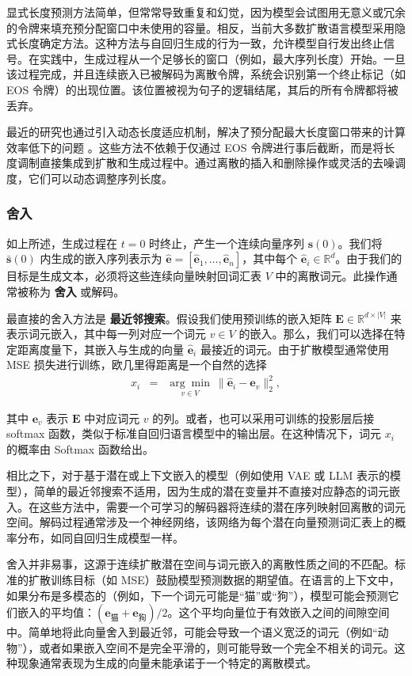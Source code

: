 显式长度预测方法简单，但常常导致重复和幻觉，因为模型会试图用无意义或冗余的令牌来填充预分配窗口中未使用的容量。相反，当前大多数扩散语言模型采用隐式长度确定方法。这种方法与自回归生成的行为一致，允许模型自行发出终止信号。在实践中，生成过程从一个足够长的窗口（例如，最大序列长度）开始。一旦该过程完成，并且连续嵌入已被解码为离散令牌，系统会识别第一个终止标记（如 EOS 令牌）的出现位置。该位置被视为句子的逻辑结尾，其后的所有令牌都将被丢弃。

最近的研究也通过引入动态长度适应机制，解决了预分配最大长度窗口带来的计算效率低下的问题 \citep{li-etal:2025fixed,yang-etal:2025diffusion}。这些方法不依赖于仅通过 EOS 令牌进行事后截断，而是将长度调制直接集成到扩散和生成过程中。通过离散的插入和删除操作或灵活的去噪调度，它们可以动态调整序列长度。
\subsubsection{舍入}

如上所述，生成过程在 $t=0$ 时终止，产生一个连续向量序列 $\mathbf{s}(0)$。我们将 $\bar{\mathbf{s}}(0)$ 内生成的嵌入序列表示为 $\hat{\mathbf{e}} = [\hat{\mathbf{e}}_1, \dots, \hat{\mathbf{e}}_n]$，其中每个 $\hat{\mathbf{e}}_i \in \mathbb{R}^d$。由于我们的目标是生成文本，必须将这些连续向量映射回词汇表 $V$ 中的离散词元。此操作通常被称为 \textbf{舍入} 或解码。

最直接的舍入方法是 \textbf{最近邻搜索}。假设我们使用预训练的嵌入矩阵 $\mathbf{E} \in \mathbb{R}^{d \times |V|}$ 来表示词元嵌入，其中每一列对应一个词元 $v \in V$ 的嵌入。那么，我们可以选择在特定距离度量下，其嵌入与生成的向量 $\hat{\mathbf{e}}_i$ 最接近的词元。由于扩散模型通常使用 MSE 损失进行训练，欧几里得距离是一个自然的选择
\begin{eqnarray}
x_i & = & \underset{v \in V}{\arg\min} \ \|\hat{\mathbf{e}}_i - \mathbf{e}_v\|_2^2,
\end{eqnarray}

\noindent 其中 $\mathbf{e}_v$ 表示 $\mathbf{E}$ 中对应词元 $v$ 的列。或者，也可以采用可训练的投影层后接 softmax 函数，类似于标准自回归语言模型中的输出层。在这种情况下，词元 $x_i$ 的概率由 Softmax 函数给出。

相比之下，对于基于潜在或上下文嵌入的模型（例如使用 VAE 或 LLM 表示的模型），简单的最近邻搜索不适用，因为生成的潜在变量并不直接对应静态的词元嵌入。在这些方法中，需要一个可学习的解码器将连续的潜在序列映射回离散的词元空间。解码过程通常涉及一个神经网络，该网络为每个潜在向量预测词汇表上的概率分布，如同自回归生成模型一样。

舍入并非易事，这源于连续扩散潜在空间与词元嵌入的离散性质之间的不匹配。标准的扩散训练目标（如 MSE）鼓励模型预测数据的期望值。在语言的上下文中，如果分布是多模态的（例如，下一个词元可能是“猫”或“狗”），模型可能会预测它们嵌入的平均值：$(\mathbf{e}_{\text{猫}} + \mathbf{e}_{\text{狗}})/2$。这个平均向量位于有效嵌入之间的间隙空间中。简单地将此向量舍入到最近邻，可能会导致一个语义宽泛的词元（例如“动物”），或者如果嵌入空间不是完全平滑的，则可能导致一个完全不相关的词元。这种现象通常表现为生成的向量未能承诺于一个特定的离散模式。

